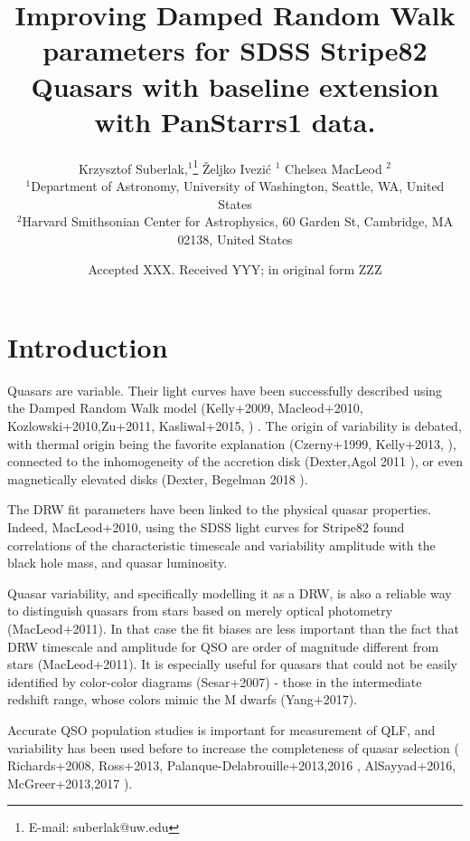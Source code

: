 \documentclass[fleqn,usenatbib]{mnras}  %
\title[DRW baseline]{ Improving Damped Random Walk parameters for SDSS Stripe82 Quasars with baseline extension with PanStarrs1 data. }
\author[K. Suberlak et al.]{
Krzysztof Suberlak,$^{1}$\thanks{E-mail: suberlak@uw.edu}
\v{Z}eljko Ivezi\'c $^{1}$
Chelsea MacLeod $^{2}$
\\
$^{1}$Department of Astronomy, University of Washington, Seattle, WA, United States\\
$^{2}$Harvard Smithsonian Center for Astrophysics, 60 Garden St, Cambridge, MA 02138, United States \\
}
\date{Accepted XXX. Received YYY; in original form ZZZ}
\begin{document}
\label{firstpage}
\pagerange{\pageref{firstpage}--\pageref{lastpage}}
\maketitle

\begin{abstract}

\end{abstract}



\section{Introduction}

Quasars are variable.  Their light curves have been successfully described using the Damped Random Walk model (Kelly+2009, Macleod+2010,  Kozlowski+2010,Zu+2011, Kasliwal+2015,   ) . The origin of variability is debated, with thermal origin being the favorite explanation (Czerny+1999,  Kelly+2013, ), connected to the inhomogeneity of the accretion disk (Dexter,Agol 2011 ), or even magnetically elevated disks (Dexter, Begelman 2018 ). 

The DRW fit parameters have been linked to the physical quasar properties. Indeed, MacLeod+2010, using the SDSS light curves for Stripe82  found correlations of the characteristic timescale and variability amplitude  with the black hole mass, and quasar luminosity. 

Quasar variability, and specifically modelling it as  a DRW, is also a reliable way to distinguish quasars from stars based on merely optical photometry (MacLeod+2011).  In that case the fit biases are less important than the fact that DRW timescale and amplitude for QSO are order of  magnitude different from stars (MacLeod+2011).  It is especially useful for quasars that could not be easily identified by color-color diagrams (Sesar+2007) - those in the intermediate redshift range, whose colors mimic the M dwarfs (Yang+2017).  

Accurate QSO population studies is important for measurement of QLF, and variability has been used before to increase the completeness of quasar selection  ( Richards+2008, Ross+2013, Palanque-Delabrouille+2013,2016 , AlSayyad+2016, McGreer+2013,2017 ). 
\end{document}

